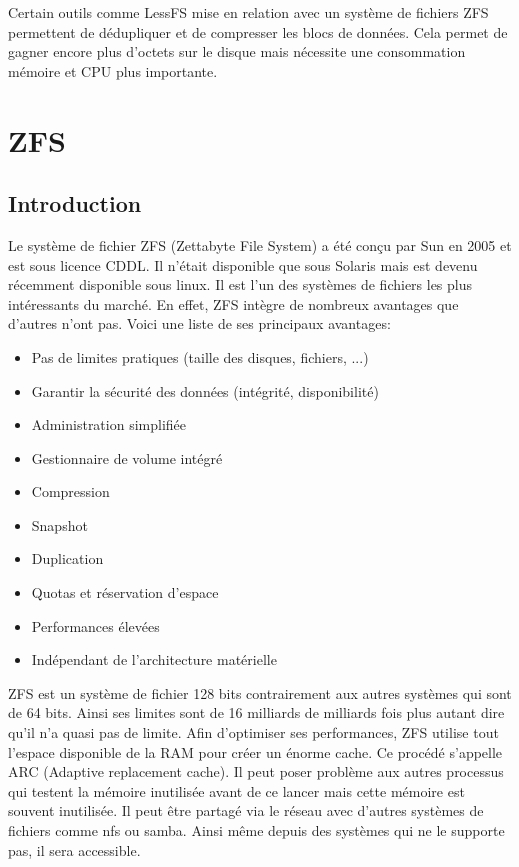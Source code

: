 \documentclass[a4paper]{report}
\begin{document}
Certain outils comme LessFS mise en relation avec un système de fichiers ZFS permettent de dédupliquer et de compresser les blocs de données. Cela permet de gagner encore plus d'octets sur le disque mais nécessite une consommation mémoire et CPU plus importante.

	\chapter{ZFS}
	\section{Introduction}
	Le système de fichier ZFS (Zettabyte File System) a été conçu par Sun en 2005 et est sous licence CDDL.  Il n'était disponible que sous Solaris mais est devenu récemment disponible sous linux. Il est l'un des systèmes de fichiers les plus intéressants du marché. En effet, ZFS intègre de nombreux avantages que d'autres n'ont pas. Voici une liste de ses principaux avantages: \\
	\begin{itemize}
		 \item Pas de limites pratiques (taille des disques, fichiers, ...)
		 \item Garantir la sécurité des données (intégrité, disponibilité)
		 \item Administration simplifiée
		 \item Gestionnaire de volume intégré
		 \item Compression
		 \item Snapshot
		 \item Duplication
		 \item Quotas et réservation d’espace
		 \item Performances élevées
		 \item Indépendant de l’architecture matérielle\\
	\end{itemize}
	ZFS est un système de fichier 128 bits contrairement aux autres systèmes qui sont de 64 bits. Ainsi ses limites sont de 16 milliards de milliards fois plus autant dire qu'il n'a quasi pas de limite. Afin d'optimiser ses performances, ZFS utilise tout l'espace disponible de la RAM pour créer un énorme cache. Ce procédé s'appelle ARC (Adaptive replacement cache). Il peut poser problème aux autres processus qui testent la mémoire inutilisée avant de ce lancer mais cette mémoire est souvent inutilisée. Il peut être partagé via le réseau avec d'autres systèmes de fichiers comme nfs ou samba. Ainsi même depuis des systèmes qui ne le supporte pas, il sera accessible.\\
\end{document}

